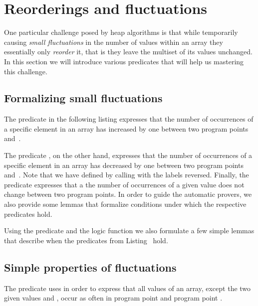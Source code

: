 

\section{Reorderings and fluctuations}
\label{sec:heap-reordering}

One particular challenge posed by heap algorithms is that
while temporarily causing \emph{small fluctuations} in the number of values
within an array they essentially only \emph{reorder} it,
that is they leave the multiset of its values unchanged.
In this section we will introduce various predicates that will help
us mastering this challenge.

\subsection{Formalizing small fluctuations}

The predicate \MultisetAdd in the following listing
expresses that the number of occurrences of a specific element in an array
has increased by one between two program points~ and~.



The predicate \MultisetMinus, on the other hand,
expresses that the number of occurrences of a specific element in an array
has decreased by one between two program points~ and~.
Note that we have defined \MultisetMinus by calling \MultisetAdd
with the labels reversed.
%
Finally, the predicate \MultisetRetain expresses that a the number
of occurrences of a given value does not change between two program points.
In order to guide the automatic provers, we also provide some
lemmas that formalize conditions under which the respective predicates hold.

Using the predicate  and the logic function 
we also formulate a few simple lemmas that describe when the
predicates from Listing~ hold.

\subsection{Simple properties of fluctuations}

The predicate  uses 
in order to express that all values of an array,
except the two given values  and , occur as often in program
point  and program point . 

